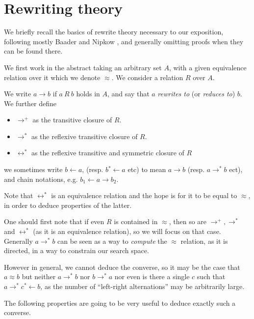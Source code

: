 \chapter{Rewriting theory}\label{rewriting-chapter}

We briefly recall the basics of rewrite theory necessary to our exposition, following mostly Baader and Nipkow \cite{traat}, and generally omitting proofs when they can be found there.

We first work in the abstract taking an arbitrary set $A$, with a given equivalence relation over it which we denote $\approx$. We consider a relation $R$ over $A$.
\begin{definition}
  We write $a \rightarrow b$ if $a\ R\ b$ holds in $A$, and say that $a$ \emph{rewrites to} (or \emph{reduces to}) $b$. We further define
  \begin{itemize}
  \item $\rightarrow^+$ as the transitive closure of $R$.
  \item $\rightarrow^*$ as the reflexive transitive closure of $R$.
  \item $\leftrightarrow^*$ as the reflexive transitive and symmetric closure of $R$
  \end{itemize}
  
  we sometimes write $b\leftarrow a$, (resp. $b{}^*\leftarrow a$ etc) to mean $a\rightarrow b$ (resp. $a\rightarrow^*b$ ect), and chain notations, e.g. $b_1\leftarrow a\rightarrow b_2$.
\end{definition}

Note that $\leftrightarrow^*$ is an equivalence relation and the hope is for it to be equal to $\approx$, in order to deduce properties of the latter.

One should first note that if even $R$ is contained in $\approx$, then so are $\rightarrow^+, \rightarrow^*$ and $\leftrightarrow^*$ (as it is an equivalence relation), so we will focus on that case. Generally $a \rightarrow^* b$ can be seen as a way to \emph{compute} the $\approx$ relation, as it is directed, in a way to constrain our search space.

However in general, we cannot deduce the converse, so it may be the case that $a\approx b$ but neither $a\rightarrow^*b$ nor $b\rightarrow^*a$ nor even is there a single $c$ such that $a\rightarrow^* c{}^*\leftarrow b$, as the number of ``left-right alternations'' may be arbitrarily large.

The following properties are going to be very useful to deduce exactly such a converse.

